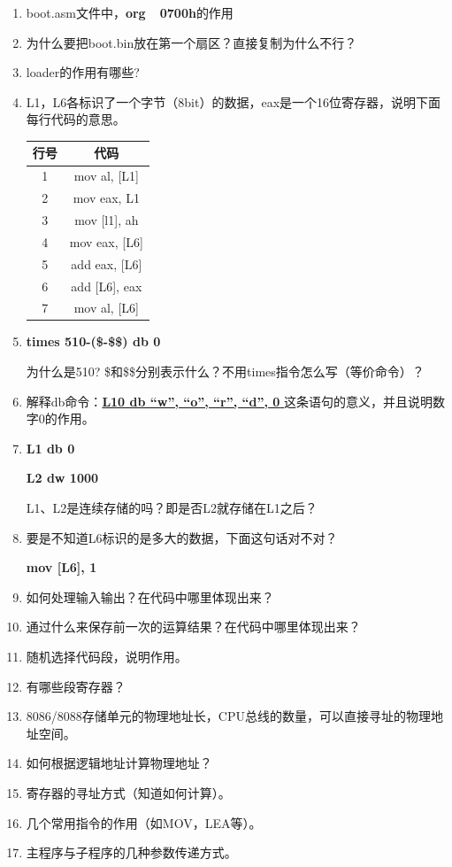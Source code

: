 \documentclass[a4paper]{article}
\begin{document}
\begin{enumerate}
	\item boot.asm文件中，\textbf{org~~0700h}的作用
	\item 为什么要把boot.bin放在第一个扇区？直接复制为什么不行？
	\item loader的作用有哪些?
	\item L1，L6各标识了一个字节（8bit）的数据，eax是一个16位寄存器，说明下面每行代码的意思。

\begin{table}
\centering
\begin{tabular}{cc}
行号 & 代码 \\\hline
1 & mov al, [L1] \\
2 & mov eax, L1 \\
3 & mov [l1], ah \\
4 & mov eax, [L6] \\
5 & add eax, [L6] \\
6 & add [L6], eax \\
7 & mov al, [L6]
\end{tabular}
\end{table}
		
	\item \textbf{times 510-(\$-\$\$) db 0}
		
		为什么是510? \$和\$\$分别表示什么？不用times指令怎么写（等价命令）？
		
	\item 解释db命令：\underline{\textbf{L10 db “w”, “o”, “r”, “d”, 0  }}这条语句的意义，并且说明数字0的作用。
	\item \textbf{L1 db 0}
		
		\textbf{L2 dw 1000}
		
		L1、L2是连续存储的吗？即是否L2就存储在L1之后？		
	\item 要是不知道L6标识的是多大的数据，下面这句话对不对？
		
		\textbf{mov [L6], 1}
	\item 如何处理输入输出？在代码中哪里体现出来？
	\item 通过什么来保存前一次的运算结果？在代码中哪里体现出来？
	\item 随机选择代码段，说明作用。
	\item 有哪些段寄存器？
	\item 8086/8088存储单元的物理地址长，CPU总线的数量，可以直接寻址的物理地址空间。
	\item 如何根据逻辑地址计算物理地址？
	\item 寄存器的寻址方式（知道如何计算）。
	\item 几个常用指令的作用（如MOV，LEA等）。
	\item 主程序与子程序的几种参数传递方式。
	
\end{enumerate}
\end{document}

